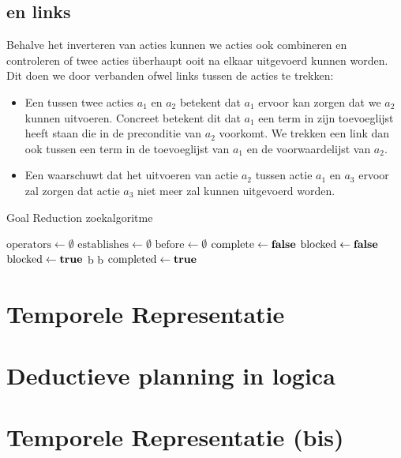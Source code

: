 \subsection{{} en {} links}
Behalve het inverteren van acties kunnen we acties ook combineren en controleren of twee acties \"uberhaupt ooit na elkaar uitgevoerd kunnen worden. Dit doen we door verbanden ofwel links tussen de acties te trekken:
\begin{itemize}
 \item Een  tussen twee acties $a_1$ en $a_2$ betekent dat $a_1$ ervoor kan zorgen dat we $a_2$ kunnen uitvoeren. Concreet betekent dit dat $a_1$ een term in zijn toevoeglijst heeft staan die in de preconditie van $a_2$ voorkomt. We trekken een {} link dan ook tussen een term in de toevoeglijst van $a_1$ en de voorwaardelijst van $a_2$.
 \item Een  waarschuwt dat het uitvoeren van actie $a_2$ tussen actie $a_1$ en $a_3$ ervoor zal zorgen dat actie $a_3$ niet meer zal kunnen uitgevoerd worden.
\end{itemize}
\begin{algorithm}[htb]
\caption{Goal Reduction zoekalgoritme}
\label{alg:goalReduction}
\begin{algorithmic}[1]
\STATE $\mbox{operators}\gets\emptyset$
\STATE $\mbox{establishes}\gets\emptyset$
\STATE $\mbox{before}\gets\emptyset$
\STATE $\mbox{complete}\gets\mbox{\bf false}$
\STATE $\mbox{blocked}\gets\mbox{\bf false}$
\STATE $\mbox{blocked}\gets\mbox{\bf true}$
\STATE b
\STATE b
\ELSE
\STATE $\mbox{completed}\gets\mbox{\bf true}$
\ENDIF
\ENDWHILE
\end{algorithmic}
\end{algorithm}
\section{Temporele Representatie}
\section{Deductieve planning in logica}
\section{Temporele Representatie (bis)}